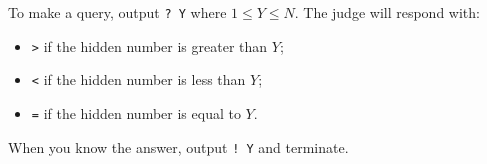 To make a query, output \texttt{? Y} where $1 \le Y \le N$. The judge will respond with:
\begin{itemize}
\item \texttt{>} if the hidden number is greater than $Y$;
\item \texttt{<} if the hidden number is less than $Y$;
\item \texttt{=} if the hidden number is equal to $Y$.
\end{itemize}
When you know the answer, output \texttt{! Y} and terminate.
